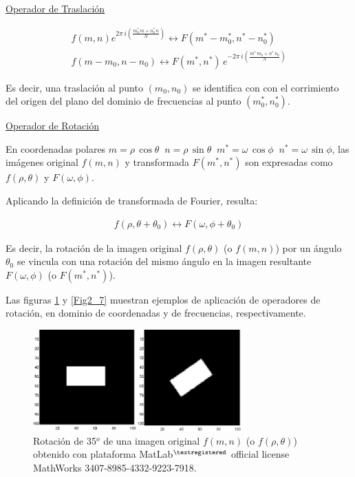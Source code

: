 \underline{Operador de Traslaci\'on}

\vspace{0.5cm}

\begin{eqnarray}
	f(m, n)e^{2 \pi \, i (\frac{m^* _{0} \, m + n^* _{0} \, n}{N})} \leftrightarrow F(m^* - m^* _{0}, n^* - n^* _{0}) \\
	f(m - m_{0}, n - n_{0}) \leftrightarrow F(m^*, n^*) \, e^{-2 \pi \, i (\frac{m^* \, m_{0} + n^* \, n_{0}}{N})} \nonumber
\label{EqLX}
\end{eqnarray}

Es decir, una traslaci\'on al punto $(m_{0}, n_{0})$ se identifica con con el corrimiento del origen del plano del dominio de frecuencias al punto
$(m^*_{0}, n^*_{0})$.
%
\vspace{1.0cm}

\underline{Operador de Rotaci\'on}

\vspace{0.5cm}

En coordenadas polares $m = \rho \, \cos{\theta} \; \; n = \rho \, \sin{\theta} \; \; m^* = \omega \, \cos{\phi} \; \; n^* = \omega \, \sin{\phi}$, las im\'agenes
original $f(m, n)$ y transformada $F(m^*, n^*)$ son expresadas como $f(\rho, \theta)$ y $F(\omega, \phi)$.
%

%
Aplicando la definici\'on de transformada de Fourier, resulta:

\begin{eqnarray}
	f(\rho, \theta + \theta_{0}) \leftrightarrow F(\omega, \phi + \theta_{0})
\label{EqLXI}
\end{eqnarray}

Es decir, la rotaci\'on de la imagen original $f(\rho, \theta)$ (o $f(m, n)$) por un \'angulo $\theta_{0}$ se vincula con una rotaci\'on del mismo \'angulo en
la imagen resultante $F(\omega, \phi)$ (o $F(m^*, n^*)$).
%

%
Las figuras \ref{Fig2_6} y \ref{Fig2_7} muestran ejemplos de aplicaci\'on de operadores de rotaci\'on, en dominio de coordenadas y de frecuencias,
respectivamente.

\vspace{1.0cm}

\begin{center}
\begin{figure} [h!]

\centering
\includegraphics[width=8cm]{figures/Fig2_6.png}

\caption{Rotaci\'on de 35$^{o}$ de una imagen original $f(m, n)$ (o $f(\rho, \theta)$) obtenido con plataforma MatLab$^{\textregistered}$ official license MathWorks 3407-8985-4332-9223-7918.}
\label{Fig2_6}

\end{figure}
\end{center}

